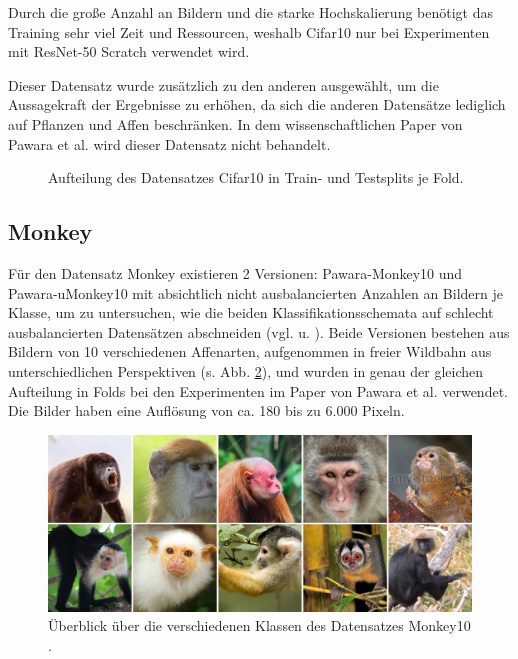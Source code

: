 Durch die große Anzahl an Bildern und die starke Hochskalierung benötigt das Training sehr viel Zeit und Ressourcen, weshalb Cifar10 nur bei Experimenten mit ResNet-50 Scratch verwendet wird.

Dieser Datensatz wurde zusätzlich zu den anderen ausgewählt, um die Aussagekraft der Ergebnisse zu erhöhen, da sich die anderen Datensätze lediglich auf Pflanzen und Affen beschränken. In dem wissenschaftlichen Paper von Pawara et al. \cite{pawaraPaper} wird dieser Datensatz nicht behandelt.

\begin{figure}[H]
\begin{adjustbox}{width=1.4\textwidth, center}

\end{adjustbox}
\caption{Aufteilung des Datensatzes Cifar10 \cite{cifar10} in Train- und Testsplits je Fold.}
\label{fig:Cifar10Zusammensetzung}
\end{figure}


\subsection{Monkey}
Für den Datensatz Monkey existieren 2 Versionen: Pawara-Monkey10 und Pawara-uMonkey10 mit absichtlich nicht ausbalancierten Anzahlen an Bildern je Klasse, um zu untersuchen, wie die beiden Klassifikationsschemata auf schlecht ausbalancierten Datensätzen abschneiden (vgl. \cite{pawaraWebsiteDatensaetze} u. \cite{pawaraPaper}). Beide Versionen bestehen aus Bildern von 10 verschiedenen Affenarten, aufgenommen in freier Wildbahn aus unterschiedlichen Perspektiven (s. Abb. \ref{fig:monkeyUeberblick}), und wurden in genau der gleichen Aufteilung in Folds bei den Experimenten im Paper von Pawara et al. \cite{pawaraPaper} verwendet.
Die Bilder haben eine Auflösung von ca. 180 bis zu 6.000 Pixeln.
\begin{figure}[H]
\centering
\includegraphics[scale=0.08]{img/2_monkey10-image.jpg}
\caption{Überblick über die verschiedenen Klassen des Datensatzes Monkey10 \cite{pawaraMonkey}.}
\label{fig:monkeyUeberblick}
\end{figure}

